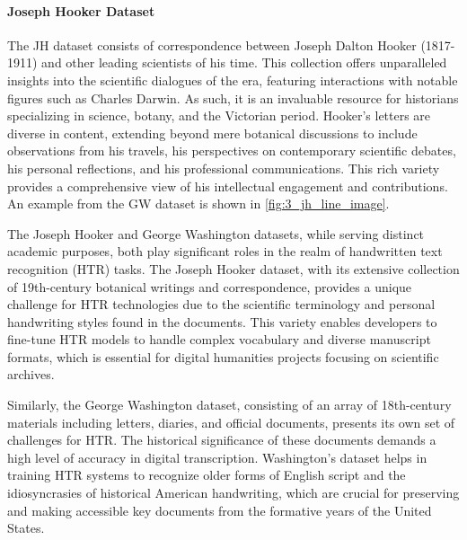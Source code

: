 
\paragraph*{Joseph Hooker Dataset}
\label{par:3_joseph_hooker_dataset}
The JH dataset consists of correspondence between Joseph Dalton Hooker (1817-1911) and other leading scientists of his time. This collection offers unparalleled insights into the scientific dialogues of the era, featuring interactions with notable figures such as Charles Darwin. As such, it is an invaluable resource for historians specializing in science, botany, and the Victorian period. Hooker’s letters are diverse in content, extending beyond mere botanical discussions to include observations from his travels, his perspectives on contemporary scientific debates, his personal reflections, and his professional communications. This rich variety provides a comprehensive view of his intellectual engagement and contributions. An example from the GW dataset is shown in \autoref{fig:3_jh_line_image}.


The Joseph Hooker and George Washington datasets, while serving distinct academic purposes, both play significant roles in the realm of handwritten text recognition (HTR) tasks. The Joseph Hooker dataset, with its extensive collection of 19th-century botanical writings and correspondence, provides a unique challenge for HTR technologies due to the scientific terminology and personal handwriting styles found in the documents. This variety enables developers to fine-tune HTR models to handle complex vocabulary and diverse manuscript formats, which is essential for digital humanities projects focusing on scientific archives.

Similarly, the George Washington dataset, consisting of an array of 18th-century materials including letters, diaries, and official documents, presents its own set of challenges for HTR. The historical significance of these documents demands a high level of accuracy in digital transcription. Washington's dataset helps in training HTR systems to recognize older forms of English script and the idiosyncrasies of historical American handwriting, which are crucial for preserving and making accessible key documents from the formative years of the United States.


